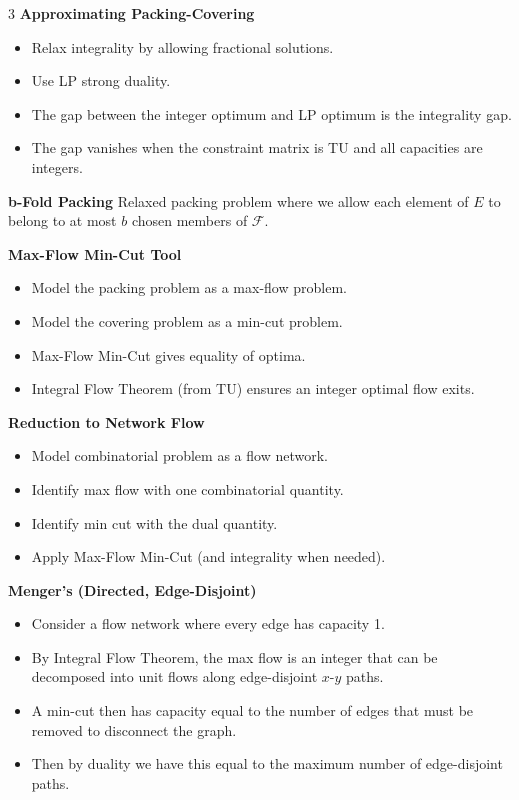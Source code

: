 \documentclass[10pt, landscape]{article}
\begin{document}
\begin{multicols*}{3}
\textbf{Approximating Packing-Covering}
\begin{itemize}
    \item Relax integrality by allowing fractional solutions.
    \item Use LP strong duality.
    \item The gap between the integer optimum and LP optimum is the integrality gap.
    \item The gap vanishes when the constraint matrix is TU and all capacities are integers.
\end{itemize}

\textbf{b-Fold Packing} Relaxed packing problem where we allow each element of $E$ to belong to at most $b$ chosen members of $\mathcal{F}$.

\textbf{Max-Flow Min-Cut Tool}
\begin{itemize}
    \item Model the packing problem as a max-flow problem.
    \item Model the covering problem as a min-cut problem.
    \item Max-Flow Min-Cut gives equality of optima.
    \item Integral Flow Theorem (from TU) ensures an integer optimal flow exits.
\end{itemize}

\textbf{Reduction to Network Flow}
\begin{itemize}
    \item Model combinatorial problem as a flow network.
    \item Identify max flow with one combinatorial quantity.
    \item Identify min cut with the dual quantity.
    \item Apply Max-Flow Min-Cut (and integrality when needed).
\end{itemize}

\textbf{Menger's (Directed, Edge-Disjoint)}
\begin{itemize}
    \item Consider a flow network where every edge has capacity 1.
    \item By Integral Flow Theorem, the max flow is an integer that can be decomposed into unit flows along edge-disjoint $x$-$y$ paths.
    \item A min-cut then has capacity equal to the number of edges that must be removed to disconnect the graph.
    \item Then by duality we have this equal to the maximum number of edge-disjoint paths.
\end{itemize}


\end{multicols*}
\end{document}
